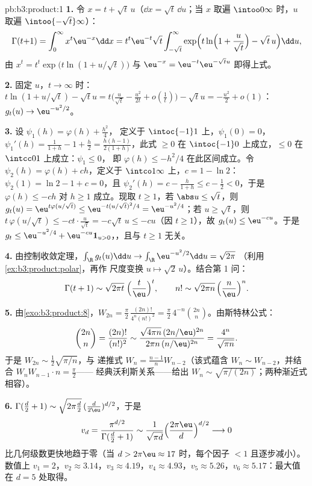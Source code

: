 \begin{solution}{pb:b3:product:1}
\textbf{1.} 令 $x = t + \sqrt t\,u$（$\dd x = \sqrt
t\,\dd u$；当 $x$ 取遍 $\intoo0\infty$ 时，$u$ 取遍
$\intoo{-\sqrt t}\infty$）：
\[
\Gamma(t{+}1) = \int_0^\infty x^t\eu^{-x}\dd x
= t^t\eu^{-t}\sqrt t\int_{-\sqrt t}^{\infty}
\exp\Bigl(t\ln\Bigl(1 + \frac u{\sqrt t}\Bigr) - \sqrt
t\,u\Bigr)\dd u,
\]
由 $x^t = t^t\exp\bigl(t\ln(1 + u/\sqrt t)\bigr)$ 与
$\eu^{-x} = \eu^{-t}\eu^{-\sqrt tu}$ 即得上式。

\textbf{2.} 固定 $u$，$t \to \infty$ 时：$t\ln(1 +
u/\sqrt t) - \sqrt tu = t\bigl(\frac u{\sqrt t} -
\frac{u^2}{2t} + o(\frac1t)\bigr) - \sqrt tu = -\frac{u^2}2 +
o(1)$：$g_t(u) \to \eu^{-u^2/2}$。

\textbf{3.} 设 $\psi_1(h) = \varphi(h) + \frac{h^2}4$，
定义于 $\intoc{-1}1$ 上，$\psi_1(0) = 0$，$\psi_1'(h) = \frac1{1+h} -
1 + \frac h2 = \frac{h(h-1)}{2(1+h)}$，此式 $\geq 0$ 在
$\intoc{-1}0$ 上成立，$\leq 0$ 在 $\intcc01$ 上成立：$\psi_1 \leq 0$，
即 $\varphi(h) \leq -h^2/4$ 在此区间成立。令 $\psi_2(h) =
\varphi(h) + ch$，定义于 $\intco1\infty$ 上，$c = 1 - \ln2$：$\psi_2(1)
= \ln2 - 1 + c = 0$，且 $\psi_2'(h) = c - \frac h{1+h} \leq c -
\frac12 < 0$，于是 $\varphi(h) \leq -ch$ 对 $h \geq 1$ 成立。现取 $t
\geq 1$，若 $\abs u \leq \sqrt t$，则 $g_t(u) =
\eu^{t\varphi(u/\sqrt t)} \leq \eu^{-t(u/\sqrt t)^2/4} =
\eu^{-u^2/4}$；若 $u \geq \sqrt t$，则 $t\,\varphi(u/\sqrt t) \leq
-ct\cdot\frac u{\sqrt t} = -c\sqrt t\,u \leq -cu$（因 $t \geq
1$），故 $g_t(u) \leq \eu^{-cu}$。于是 $g_t \leq \eu^{-u^2/4} +
\eu^{-cu}\mathbf 1_{u>0}$，，且与 $t \geq
1$ 无关。

\textbf{4.} 由控制收敛定理，$\int_\R g_t(u)\dd u \to
\int_\R\eu^{-u^2/2}\dd u = \sqrt{2\pi}$
（利用\cref{ex:b3:product:polar}，再作
尺度变换 $u\mapsto\sqrt2\,u$）。结合第 1 问：
\[
\Gamma(t + 1) \sim \sqrt{2\pi t}\;\Bigl(\frac
t\eu\Bigr)^t,\qquad
n! \sim \sqrt{2\pi n}\,\Bigl(\frac n\eu\Bigr)^n .
\]

\textbf{5.} 由\cref{exo:b3:product:8}，$W_{2n} =
\frac\pi2\,\frac{(2n)!}{4^n(n!)^2} =
\frac\pi2\,4^{-n}\binom{2n}n$。由斯特林公式：
\[
\binom{2n}{n} = \frac{(2n)!}{(n!)^2}
\sim \frac{\sqrt{4\pi n}\,(2n/\eu)^{2n}}
{2\pi n\,(n/\eu)^{2n}} = \frac{4^n}{\sqrt{\pi n}} .
\]
于是 $W_{2n} \sim \frac12\sqrt{\pi/n}$，与
递推式 $W_n = \frac{n-1}nW_{n-2}$（该式蕴含 $W_n \sim
W_{n-2}$，并结合 $W_nW_{n-1}\cdot n = \frac\pi2$——
经典沃利斯关系——给出 $W_n \sim
\sqrt{\pi/(2n)}$；两种渐近式相容）。

\textbf{6.} $\Gamma(\frac d2 + 1) \sim \sqrt{2\pi\frac
d2}\,(\frac d{2\eu})^{d/2}$，于是
\[
v_d = \frac{\pi^{d/2}}{\Gamma(\frac d2 + 1)}
\sim \frac{1}{\sqrt{\pi d}}\Bigl(\frac{2\pi\eu}
d\Bigr)^{d/2} \longrightarrow 0
\]
比几何级数更快地趋于零（当 $d > 2\pi\eu \approx 17$ 时，每个因子
$< 1$ 且逐步减小）。数值上 $v_1 = 2$，$v_2 \approx
3.14$，$v_3 \approx 4.19$，$v_4 \approx 4.93$，$v_5 \approx
5.26$，$v_6 \approx 5.17$：最大值在 $d = 5$ 处取得。


\end{solution}
